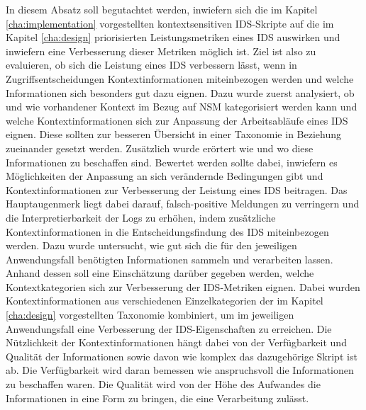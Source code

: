 In diesem Absatz soll begutachtet werden, inwiefern sich die im Kapitel \ref{cha:implementation} vorgestellten kontextsensitiven IDS-Skripte auf die im Kapitel \ref{cha:design} priorisierten Leistungsmetriken eines IDS auswirken und inwiefern eine Verbesserung dieser Metriken möglich ist. Ziel ist also zu evaluieren, ob sich die Leistung eines IDS verbessern lässt, wenn in Zugriffsentscheidungen Kontextinformationen miteinbezogen werden und welche Informationen sich besonders gut dazu eignen.
Dazu wurde zuerst analysiert, ob und wie vorhandener Kontext im Bezug auf NSM kategorisiert werden kann und welche Kontextinformationen sich zur Anpassung der Arbeitsabläufe eines IDS eignen. Diese sollten zur besseren Übersicht in einer Taxonomie in Beziehung zueinander gesetzt werden. Zusätzlich wurde erörtert wie und wo diese Informationen zu beschaffen sind. Bewertet werden sollte dabei, inwiefern es Möglichkeiten der Anpassung an sich verändernde Bedingungen gibt und Kontextinformationen zur Verbesserung der Leistung eines IDS beitragen.
Das Hauptaugenmerk liegt dabei darauf, falsch-positive Meldungen zu verringern und die Interpretierbarkeit der Logs zu erhöhen, indem zusätzliche Kontextinformationen in die Entscheidungsfindung des IDS miteinbezogen werden. Dazu wurde untersucht, wie gut sich die für den jeweiligen Anwendungsfall benötigten Informationen sammeln und verarbeiten lassen. Anhand dessen soll eine Einschätzung darüber gegeben werden, welche Kontextkategorien sich zur Verbesserung der IDS-Metriken eignen.
Dabei wurden Kontextinformationen aus verschiedenen Einzelkategorien der im Kapitel \ref{cha:design} vorgestellten Taxonomie kombiniert, um im jeweiligen Anwendungsfall eine Verbesserung der IDS-Eigenschaften zu erreichen.
Die Nützlichkeit der Kontextinformationen hängt dabei von der Verfügbarkeit und Qualität der Informationen sowie davon wie komplex das dazugehörige Skript ist ab. 
Die Verfügbarkeit wird daran bemessen wie anspruchsvoll die Informationen zu beschaffen waren. Die Qualität wird von der Höhe des Aufwandes die Informationen in eine Form zu bringen, die eine Verarbeitung zulässt.
